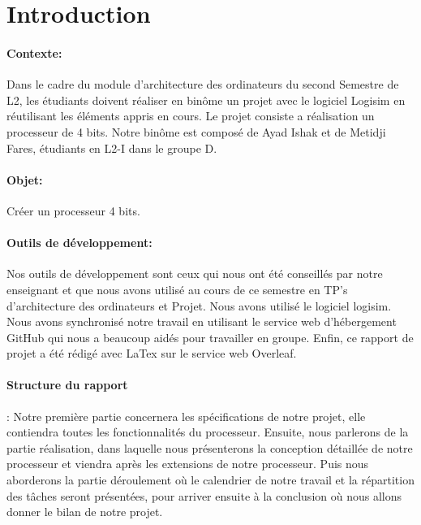 \section{Introduction}

\label{sec:introduction}

\paragraph{Contexte:}
Dans le cadre du module d'architecture des ordinateurs du second Semestre de L2, les étudiants doivent réaliser en binôme un projet avec le logiciel Logisim en réutilisant les éléments appris en cours.
Le projet consiste a réalisation un processeur de 4 bits. Notre binôme est composé de Ayad Ishak et de Metidji Fares, étudiants en L2-I dans le groupe D.

\paragraph{Objet:}
Créer un processeur 4 bits.

\paragraph{Outils de développement:}
Nos outils de développement sont ceux qui nous ont été conseillés par notre enseignant et que nous avons utilisé au cours de ce semestre en TP's d'architecture des ordinateurs et Projet. Nous avons utilisé le logiciel logisim. Nous avons synchronisé notre travail en utilisant le service web d'hébergement GitHub qui nous a beaucoup aidés pour travailler en groupe. Enfin, ce rapport de projet a été rédigé avec LaTex sur le service web Overleaf.

\paragraph{Structure du rapport}:
Notre première partie concernera les spécifications de notre projet, elle contiendra toutes les fonctionnalités du processeur. Ensuite, nous parlerons de la partie réalisation, dans laquelle nous présenterons la conception détaillée de notre processeur et viendra après les extensions de notre processeur. Puis nous aborderons la partie déroulement où le calendrier de notre travail et la répartition des tâches seront présentées, pour arriver ensuite à la conclusion où nous allons donner le bilan de notre projet.